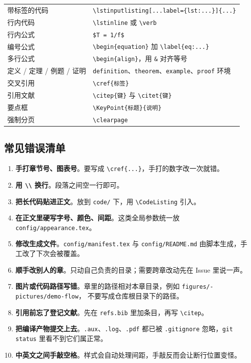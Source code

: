 \begin{longtable}{@{}p{40mm}p{94mm}@{}}
带标签的代码 & \texttt{\textbackslash lstinputlisting[...label=\{lst:...\}]\{...\}} \\
行内代码 & \texttt{\textbackslash lstinline} 或 \texttt{\textbackslash verb} \\
行内公式 & \texttt{\$T = 1/f\$} \\
编号公式 & \texttt{\textbackslash begin\{equation\}} 加 \texttt{\textbackslash label\{eq:...\}} \\
多行公式 & \texttt{\textbackslash begin\{align\}}，用 \texttt{\&} 对齐等号 \\
定义 / 定理 / 例题 / 证明 & \texttt{definition}、\texttt{theorem}、\texttt{example}、\texttt{proof} 环境 \\
交叉引用 & \texttt{\textbackslash cref\{标签\}} \\
引用文献 & \texttt{\textbackslash citep\{键\}} 与 \texttt{\textbackslash citet\{键\}} \\
要点框 & \texttt{\textbackslash KeyPoint\{标题\}\{说明\}} \\
强制分页 & \texttt{\textbackslash clearpage} \\
\end{longtable}

\subsection{常见错误清单}

\begin{enumerate}
  \item \textbf{手打章节号、图表号}。要写成 \verb|\cref{...}|，手打的数字改一次就错。
  \item \textbf{用 \texttt{\textbackslash\textbackslash} 换行}。段落之间空一行即可。
  \item \textbf{把长代码贴进正文}。放到 \texttt{code/} 下，用 \verb|\CodeListing| 引入。
  \item \textbf{在正文里硬写字号、颜色、间距}。这类全局参数统一放
        \texttt{config/appearance.tex}。
  \item \textbf{修改生成文件}。\texttt{config/manifest.tex} 与 \texttt{config/README.md}
        由脚本生成，手工改了下次会被覆盖。
  \item \textbf{顺手改别人的章}。只动自己负责的目录；需要跨章改动先在 Issue 里说一声。
  \item \textbf{图片或代码路径写错}。章里的路径相对本章目录，例如
        \texttt{figures/-pictures/\allowbreak demo-flow}，
        不要写成仓库根目录下的路径。
  \item \textbf{引用前忘了登记文献}。先在 \texttt{refs.bib} 里加条目，再写 \verb|\citep|。
  \item \textbf{把编译产物提交上去}。\texttt{.aux}、\texttt{.log}、\texttt{.pdf} 都已被
        \texttt{.gitignore} 忽略，\texttt{git status} 里看不到它们属正常。
  \item \textbf{中英文之间手敲空格}。样式会自动处理间距，手敲反而会让断行位置变怪。
\end{enumerate}

